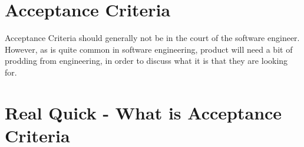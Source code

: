 \maketitle{}
\section{ Acceptance Criteria }
Acceptance Criteria should generally not be in the court of the software
engineer. However, as is quite common in software engineering, product will
need a bit of prodding from engineering, in order to discuss what it is that
they are looking for.

\section{ Real Quick - What is Acceptance Criteria }
